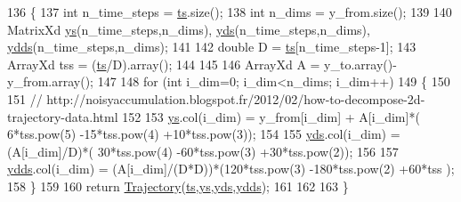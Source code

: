 \begin{DoxyCode}
136 \{
137   \textcolor{keywordtype}{int} n\_time\_steps = \hyperlink{classDmpBbo_1_1Trajectory_a0ac526fb2e2e77134906a4b657d795d2}{ts}.size();
138   \textcolor{keywordtype}{int} n\_dims = y\_from.size();
139   
140   MatrixXd \hyperlink{classDmpBbo_1_1Trajectory_a7e10cffc4d5b8099986c835f9337eab4}{ys}(n\_time\_steps,n\_dims), \hyperlink{classDmpBbo_1_1Trajectory_ad5772d5db1c6af36cf1de2eed2447702}{yds}(n\_time\_steps,n\_dims), \hyperlink{classDmpBbo_1_1Trajectory_ac2ce234816063eeeead69a146651fef7}{ydds}(n\_time\_steps,n\_dims);
141   
142   \textcolor{keywordtype}{double} D =  \hyperlink{classDmpBbo_1_1Trajectory_a0ac526fb2e2e77134906a4b657d795d2}{ts}[n\_time\_steps-1];
143   ArrayXd tss = (\hyperlink{classDmpBbo_1_1Trajectory_a0ac526fb2e2e77134906a4b657d795d2}{ts}/D).array(); 
144     
145 
146   ArrayXd A = y\_to.array()-y\_from.array();
147   
148   \textcolor{keywordflow}{for} (\textcolor{keywordtype}{int} i\_dim=0; i\_dim<n\_dims; i\_dim++)
149   \{
150     
151     \textcolor{comment}{// http://noisyaccumulation.blogspot.fr/2012/02/how-to-decompose-2d-trajectory-data.html}
152     
153     \hyperlink{classDmpBbo_1_1Trajectory_a7e10cffc4d5b8099986c835f9337eab4}{ys}.col(i\_dim)   = y\_from[i\_dim] + A[i\_dim]*(  6*tss.pow(5)  -15*tss.pow(4) +10*tss.pow(3));
154     
155     \hyperlink{classDmpBbo_1_1Trajectory_ad5772d5db1c6af36cf1de2eed2447702}{yds}.col(i\_dim)  =             (A[i\_dim]/D)*( 30*tss.pow(4)  -60*tss.pow(3) +30*tss.pow(2));
156     
157     \hyperlink{classDmpBbo_1_1Trajectory_ac2ce234816063eeeead69a146651fef7}{ydds}.col(i\_dim) =         (A[i\_dim]/(D*D))*(120*tss.pow(3) -180*tss.pow(2) +60*tss       );
158   \}
159   
160   \textcolor{keywordflow}{return} \hyperlink{classDmpBbo_1_1Trajectory_aa635b61a4223224b821d156a27dbb2b8}{Trajectory}(\hyperlink{classDmpBbo_1_1Trajectory_a0ac526fb2e2e77134906a4b657d795d2}{ts},\hyperlink{classDmpBbo_1_1Trajectory_a7e10cffc4d5b8099986c835f9337eab4}{ys},\hyperlink{classDmpBbo_1_1Trajectory_ad5772d5db1c6af36cf1de2eed2447702}{yds},\hyperlink{classDmpBbo_1_1Trajectory_ac2ce234816063eeeead69a146651fef7}{ydds});
161  
162   
163 \}
\end{DoxyCode}



